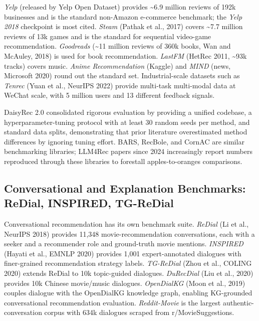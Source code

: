 \documentclass{article}
\begin{document}
\emph{Yelp} (released by Yelp Open Dataset) provides \textasciitilde6.9 million reviews of 192k businesses and is the standard non-Amazon e-commerce benchmark; the \emph{Yelp 2018} checkpoint is most cited. \emph{Steam} (Pathak et al., 2017) covers \textasciitilde7.7 million reviews of 13k games and is the standard for sequential video-game recommendation. \emph{Goodreads} (\textasciitilde11 million reviews of 360k books, Wan and McAuley, 2018) is used for book recommendation. \emph{LastFM} (HetRec 2011, \textasciitilde93k tracks) covers music. \emph{Anime Recommendation} (Kaggle) and \emph{MIND} (news, Microsoft 2020) round out the standard set. Industrial-scale datasets such as \emph{Tenrec} (Yuan et al., NeurIPS 2022) provide multi-task multi-modal data at WeChat scale, with 5 million users and 13 different feedback signals.

DaisyRec 2.0 \citep{sun2022daisyrec20benchmar} consolidated rigorous evaluation by providing a unified codebase, a hyperparameter-tuning protocol with at least 30 random seeds per method, and standard data splits, demonstrating that prior literature overestimated method differences by ignoring tuning effort. BARS, RecBole, and CornAC are similar benchmarking libraries; LLM4Rec papers since 2024 increasingly report numbers reproduced through these libraries to forestall apples-to-oranges comparisons.

\subsection{Conversational and Explanation Benchmarks: ReDial, INSPIRED, TG-ReDial}\label{conversational-and-explanation-benchmarks-redial-inspired-tg-redial}

Conversational recommendation has its own benchmark suite. \emph{ReDial} (Li et al., NeurIPS 2018) provides 11,348 movie-recommendation conversations, each with a seeker and a recommender role and ground-truth movie mentions. \emph{INSPIRED} (Hayati et al., EMNLP 2020) provides 1,001 expert-annotated dialogues with finer-grained recommendation strategy labels. \emph{TG-ReDial} (Zhou et al., COLING 2020) extends ReDial to 10k topic-guided dialogues. \emph{DuRecDial} (Liu et al., 2020) provides 10k Chinese movie/music dialogues. \emph{OpenDialKG} (Moon et al., 2019) couples dialogue with the OpenDialKG knowledge graph, enabling KG-grounded conversational recommendation evaluation. \emph{Reddit-Movie} \citep{he2023largelanguagemodel} is the largest authentic-conversation corpus with 634k dialogues scraped from r/MovieSuggestions.
\end{document}
